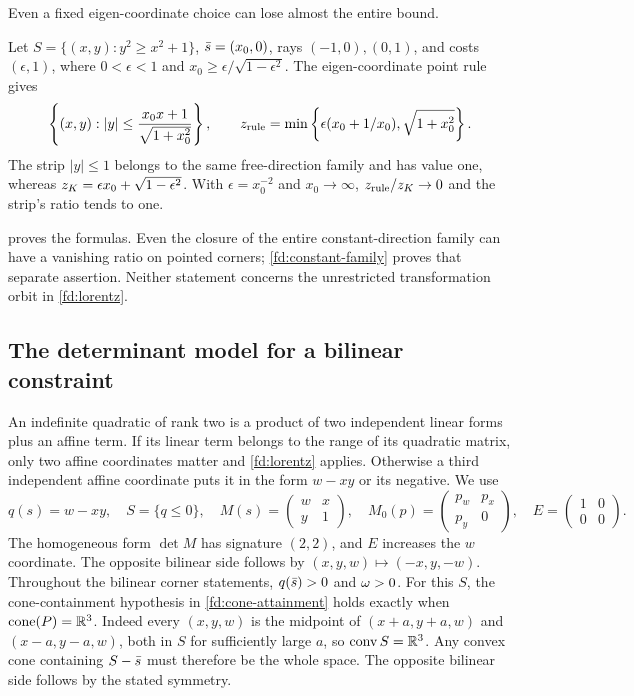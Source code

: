 Even a fixed eigen-coordinate choice can lose almost the entire bound.
\begin{proposition}\label{fd:fixed-rule}
Let $S=\{(x,y):y^2\ge x^2+1\}$, $\bar s=(x_0,0)$, rays
$(-1,0),(0,1)$, and costs $(\epsilon,1)$, where
$0<\epsilon<1$ and $x_0\ge\epsilon/\sqrt{1-\epsilon^2}$.
The eigen-coordinate point rule gives
\[
 \left\{(x,y):|y|\le\frac{x_0x+1}{\sqrt{1+x_0^2}}\right\},\qquad
 z_{\rm rule}=\min\left\{\epsilon(x_0+1/x_0),\sqrt{1+x_0^2}\right\}.
\]
The strip $|y|\le1$ belongs to the same free-direction family and has
value one, whereas
$z_K=\epsilon x_0+\sqrt{1-\epsilon^2}$.
With $\epsilon=x_0^{-2}$ and $x_0\to\infty$,
$z_{\rm rule}/z_K\to0$ and the strip's ratio tends to one.
\end{proposition}
 proves the formulas.
Even the closure of the entire constant-direction family can have a
vanishing ratio on pointed corners; \cref{fd:constant-family} proves
that separate assertion. Neither statement concerns the unrestricted
transformation orbit in \cref{fd:lorentz}.

\subsection{The determinant model for a bilinear constraint}

An indefinite quadratic of rank two is a product of two independent
linear forms plus an affine term. If its linear term belongs to the
range of its quadratic matrix, only two affine coordinates matter and
\cref{fd:lorentz} applies. Otherwise a third independent affine coordinate
puts it in the form $w-xy$ or its negative. We use
\begin{equation}\label{fd:det-model}
 q(s)=w-xy,\quad S=\{q\le0\},\quad
 M(s)=\begin{pmatrix}w&x\\y&1\end{pmatrix},\quad
 M_0(p)=\begin{pmatrix}p_w&p_x\\p_y&0\end{pmatrix},\quad
 E=\begin{pmatrix}1&0\\0&0\end{pmatrix}.
\end{equation}
The homogeneous form $\det M$ has signature $(2,2)$, and $E$ increases
the $w$ coordinate. The opposite bilinear side follows by
$(x,y,w)\mapsto(-x,y,-w)$.
Throughout the bilinear corner statements, $q(\bar s)>0$ and $\omega>0$.
For this $S$, the cone-containment hypothesis in
\cref{fd:cone-attainment} holds exactly when $\operatorname{cone}(P)=\mathbb R^3$.
Indeed every $(x,y,w)$ is the midpoint of
$(x+a,y+a,w)$ and $(x-a,y-a,w)$, both in $S$ for sufficiently large
$a$, so $\operatorname{conv} S=\mathbb R^3$. Any convex cone containing $S-\bar s$ must
therefore be the whole space. The opposite bilinear side follows
by the stated symmetry.

